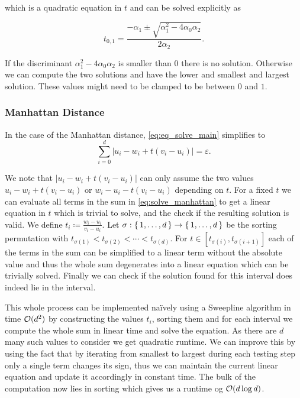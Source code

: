 which is a quadratic equation in \(t\) and can be solved explicitly as 

\begin{equation}
  t_{0,1} = \frac{-\alpha_1 \pm \sqrt{\alpha_1^2 - 4\alpha_0\alpha_2}}{2\alpha_2}.\label{eq:sol_explicit_euclidean}
\end{equation}

If the discriminant \(\alpha_1^2 - 4\alpha_0\alpha_2\) is smaller than \(0\) there is no solution. Otherwise we can compute the two solutions and have the lower and smallest and largest solution. These values might need to be clamped to be between \(0\) and \(1\). 


\subsubsection{Manhattan Distance}
\label{subsubsec:eq_manhattan_distance}
In the case of the Manhattan distance, \cref{eq:eq_solve_main} simplifies to 
\begin{equation}
  \sum_{i=0}^d |u_i - w_i + t (v_i - u_i)| = \varepsilon. \label{eq:solve_manhattan}
\end{equation}

We note that \(|u_i - w_i + t (v_i - u_i )|\) can only assume the two values \(u_i - w_i + t(v_i - u_i)\) or \(w_i - u_i - t(v_i - u_i)\) depending on \(t\). For a fixed \(t\) we can evaluate all terms in the sum in \cref{eq:solve_manhattan} to get a linear equation in \(t\) which is trivial to solve, and the check if the resulting solution is valid. We define \(t_i \coloneq \frac{w_i - u_i}{v_i - u_i} \). Let \(\sigma:\set{1,\dots, d} \to \set{1,\dots, d}\) be the sorting permutation with \(t_{\sigma(1)} < t_{\sigma(2)} < \cdots < t_{\sigma(d)}\). For \(t \in [t_{\sigma(i)}, t_{\sigma(i+1)}]\) each of the terms in the sum can be simplified to a linear term without the absolute value and thus the whole sum degenerates into a linear equation which can be trivially solved. Finally we can check if the solution found for this interval does indeed lie in the interval. 

This whole process can be implemented na\"ively using a Sweepline algorithm in time \(\mathcal{O}(d^2)\) by constructing the values \(t_i\), sorting them and for each interval we compute the whole sum in linear time and solve the equation. As there are \(d\) many such values to consider we get quadratic runtime. We can improve this by using the fact that by iterating from smallest to largest during each testing step only a single term changes its sign, thus we can maintain the current linear equation and update it accordingly in constant time. The bulk of the computation now lies in sorting which gives us a runtime og \(\mathcal{O}(d \log d)\). 

